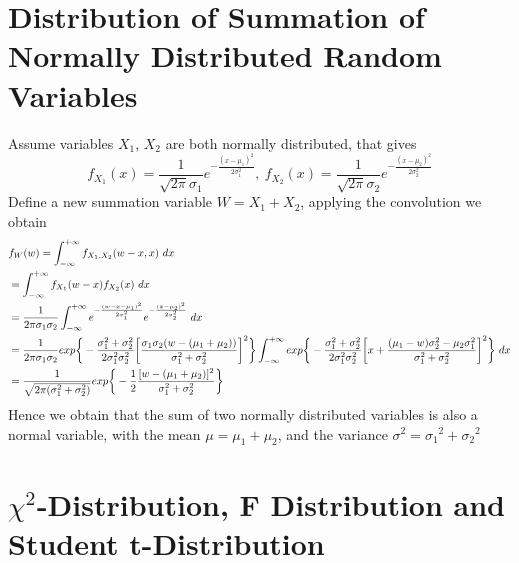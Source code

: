 \documentclass[16pt]{article}
\begin{document}
\section{Distribution of Summation of Normally Distributed Random Variables}
Assume variables $X_1$, $X_2$ are both normally distributed, that gives
\begin{equation}
f_{X_1}(x) = \frac{1}{\sqrt{2 \pi}\sigma_1} e^{-\frac{(x-\mu_1)^2}{2\sigma_1^2}},~f_{X_2}(x) = \frac{1}{\sqrt{2 \pi}\sigma_2} e^{-\frac{(x-\mu_2)^2}{2\sigma_2^2}}
\end{equation}
Define a new summation variable $W = X_1 + X_2$, applying the convolution we obtain
\begin{equation}
\begin{aligned}
    &f_W(w) = \int^{+\infty}_{-\infty} f_{X_1, X_2} (w-x, x)~dx \\ &=
    \int^{+\infty}_{-\infty} f_{X_1}(w-x) f_{X_2}(x)~dx \\
    &= \frac{1}{2\pi \sigma_1 \sigma_2}\int^{+\infty}_{-\infty} e^{-\frac{(w-x-\mu_1)^2}{2\sigma_1^2}}e^{-\frac{(x-\mu_2)^2}{2\sigma_2^2}}~dx \\
    &= \frac{1}{2\pi \sigma_1 \sigma_2} exp\bigg\{ -\frac{\sigma_1^2 + \sigma_2^2}{2\sigma_1^2\sigma_2^2}\bigg[\frac{\sigma_1\sigma_2(w-(\mu_1+\mu_2))}{\sigma_1^2 + \sigma_2^2} \bigg]^2 \bigg\} \int_{-\infty}^{+\infty} exp\bigg\{ -\frac{\sigma_1^2+\sigma_2^2}{2\sigma_1^2\sigma_2^2} \bigg[x+\frac{(\mu_1-w)\sigma_2^2-\mu_2\sigma_1^2}{\sigma_1^2+\sigma_2^2}\bigg]^2 \bigg\}~dx \\
    &= \frac{1}{\sqrt{2\pi(\sigma_1^2+\sigma_2^2)}}exp\bigg\{-\frac{1}{2}\frac{[w-(\mu_1+\mu_2)]^2}{\sigma_1^2 + \sigma_2^2}\bigg\} \notag
\end{aligned}
\end{equation}
Hence we obtain that the sum of two normally distributed variables is also a normal variable, with the mean $\mu = \mu_1 + \mu_2$, and the variance $\sigma^2  = {\sigma_1}^2 + {\sigma_2}^2$
\section{$\chi^2$-Distribution, F Distribution and Student t-Distribution}
\end{document}
